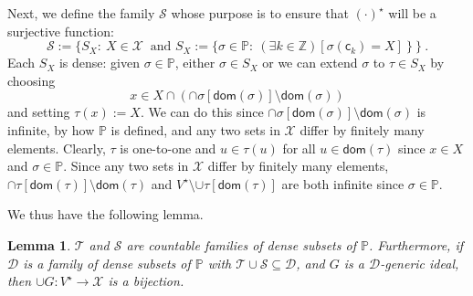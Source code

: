 \documentclass[10pt,a4paper, openany,  oldfontcommands]{memoir}
\newtheorem{lemma} [theorem] {Lemma}
\newtheorem{open problem} [theorem] {Open Problem}
\begin{document}
Next, we define the family    $  \mathcal{S}  $ whose purpose is to ensure that 
 $  (  \cdot )^{  \star }   $
 will be a surjective function: 
  \[
  \mathcal{S}    :=  \Big\{   S_X   :   \   X \in   \mathcal{X}      \  \mbox{ and  }   
  S_X :=  \big\{  \sigma   \in \mathbb{P}  :   \   
   \left(  \exists  k  \in  \mathbb{Z}  \right)  \left[       \sigma  \left(    \mathsf{c}_k  \right)     =  X   \right]      \    \big\}
  \    \Big\} 
  \        .
 \]
Each       $  S_X   $ is dense: 
 given  $  \sigma  \in \mathbb{P} $, 
either  $  \sigma  \in   S_X  $  or we can extend $  \sigma  $  to   $  \tau  \in  S_X  $  by  
choosing 
\[
x  \in  X   \cap     \left(    \cap    \sigma  \left[  \mathsf{dom} \left(   \sigma  \right)  \right]     \setminus     \mathsf{dom} \left(   \sigma  \right)    \right)  
\]
and setting      $  \tau  \left(    x  \right) :=  X   $.
We  can do this since   $   \cap    \sigma  \left[  \mathsf{dom} \left(   \sigma  \right)  \right]     \setminus     \mathsf{dom} \left(   \sigma  \right)   $   is infinite,  by how  $  \mathbb{P} $  is defined, 
and  any two sets  in  $   \mathcal{X} $  differ by finitely many elements. 
Clearly,  $  \tau $  is one-to-one and  $  u  \in  \tau (u)  $  for all  $  u   \in   \mathsf{dom} \left(   \tau  \right)    $  
since  $  x  \in  X  $  and  $  \sigma   \in  \mathbb{P} $. 
Since  any two sets in $  \mathcal{X} $  differ by finitely many elements,  
$  \cap   \tau   \left[   \mathsf{dom} \left(  \tau \right)   \right]   \setminus   \mathsf{dom} \left(  \tau \right)   $  
and  $  V^{  \star }  \setminus  \cup   \tau   \left[   \mathsf{dom} \left(  \tau \right)   \right]    $  are both infinite
since  $  \sigma  \in  \mathbb{P} $. 



We thus have the following lemma. 


\begin{lemma}  \label{SecondBasicLemma}
$   \mathcal{T}  $  and   $   \mathcal{S}   $  are  countable families of dense subsets of  $  \mathbb{P} $. 
Furthermore, if  $   \mathcal{D}   $  is a family of dense subsets of $  \mathbb{P} $ with  $ \mathcal{T}  \cup   \mathcal{S}    \subseteq  \mathcal{D} $, 
and  $G$ is a  $   \mathcal{D}   $-generic ideal, 
then $  \cup G   :  V^{  \star }     \to        \mathcal{X}   $ is a bijection.    
\end{lemma}
\end{document}
